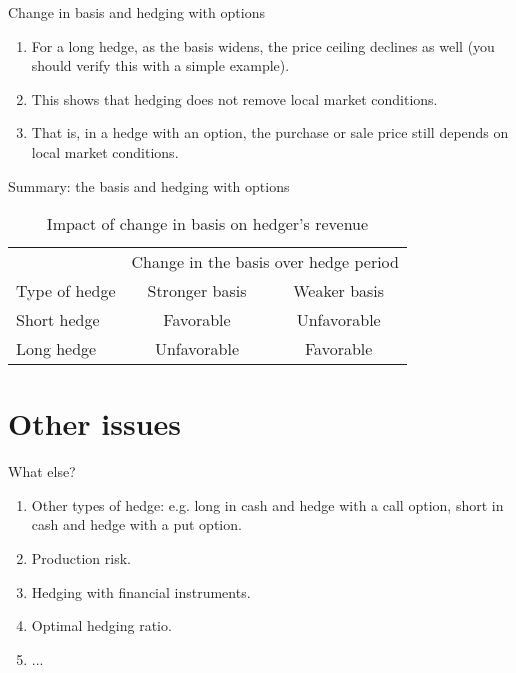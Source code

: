 \documentclass[table,xcolor=pdftex,dvipsnames, handout]{beamer}\usepackage[]{graphicx}\usepackage[]{color}
\begin{document}

\begin{frame}{Change in basis and hedging with options}
\begin{enumerate}[label=\textbullet]
  \item For a long hedge, as the basis widens, the price ceiling declines as well (you should verify this with a simple example).
  \item This shows that hedging does not remove local market conditions.
  \item That is, in a hedge with an option, the purchase or sale price still depends on local market conditions.
\end{enumerate}
\end{frame}


\begin{frame}{Summary: the basis and hedging with options}
\begin{table}
\caption{Impact of change in basis on hedger's revenue}
\begin{tabular}{l c c}
  \toprule
  & \multicolumn{2}{c}{Change in the basis over hedge period}\\
  \cmidrule(r){2-3}
  Type of hedge & Stronger basis & Weaker basis\\
  \midrule
   Short hedge & Favorable  & Unfavorable \\
   Long hedge &  Unfavorable & Favorable \\
  \bottomrule
\end{tabular}
\end{table}
\end{frame}

\section{Other issues}

\begin{frame}{What else?}
\begin{enumerate}[label=\textbullet]
  \item Other types of hedge: e.g. long in cash and hedge with a call option, short in cash and hedge with a put option.
  \item Production risk.
  \item Hedging with financial instruments.
  \item Optimal hedging ratio.
  \item ...
\end{enumerate}
\end{frame}
\end{document}
